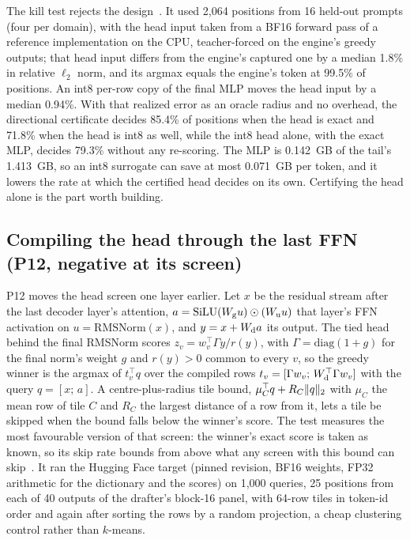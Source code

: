 The kill test rejects the design~. It used 2,064 positions from 16 held-out prompts (four per domain), with the head input taken from a BF16 forward pass of a reference implementation on the CPU, teacher-forced on the engine's greedy outputs; that head input differs from the engine's captured one by a median 1.8\% in relative $\ell_2$ norm, and its argmax equals the engine's token at 99.5\% of positions. An int8 per-row copy of the final MLP moves the head input by a median 0.94\%. With that realized error as an oracle radius and no overhead, the directional certificate decides 85.4\% of positions when the head is exact and 71.8\% when the head is int8 as well, while the int8 head alone, with the exact MLP, decides 79.3\% without any re-scoring. The MLP is 0.142~GB of the tail's 1.413~GB, so an int8 surrogate can save at most 0.071~GB per token, and it lowers the rate at which the certified head decides on its own. Certifying the head alone is the part worth building.

\subsection{Compiling the head through the last FFN (P12, negative at its screen)}\label{app:p12}
P12 moves the head screen one layer earlier. Let $x$ be the residual stream after the last decoder layer's attention, $a=\mathrm{SiLU}(W_{\rm g}u)\odot(W_{\rm u}u)$ that layer's FFN activation on $u=\mathrm{RMSNorm}(x)$, and $y=x+W_{\rm d}a$ its output. The tied head behind the final RMSNorm scores $z_v=w_v^\top\Gamma y/r(y)$, with $\Gamma=\mathrm{diag}(1+g)$ for the final norm's weight $g$ and $r(y)>0$ common to every $v$, so the greedy winner is the argmax of $t_v^\top q$ over the compiled rows $t_v=[\Gamma w_v;\,W_{\rm d}^\top\Gamma w_v]$ with the query $q=[x;\,a]$. A centre-plus-radius tile bound, $\mu_C^\top q+R_C\lVert q\rVert_2$ with $\mu_C$ the mean row of tile $C$ and $R_C$ the largest distance of a row from it, lets a tile be skipped when the bound falls below the winner's score. The test measures the most favourable version of that screen: the winner's exact score is taken as known, so its skip rate bounds from above what any screen with this bound can skip~. It ran the Hugging Face target (pinned revision, BF16 weights, FP32 arithmetic for the dictionary and the scores) on 1,000 queries, 25 positions from each of 40 outputs of the drafter's block-16 panel, with 64-row tiles in token-id order and again after sorting the rows by a random projection, a cheap clustering control rather than $k$-means.

